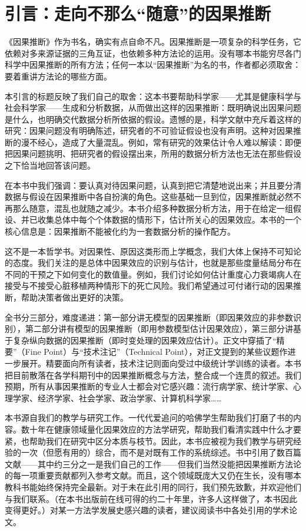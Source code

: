 \chapter*{引言：走向不那么“随意”的因果推断}
\thispagestyle{plain}

《因果推断》作为书名，确实有点自命不凡。因果推断是一项复杂的科学任务，它依赖对多来源证据的三角互证，也依赖多种方法论的运用。没有哪本书能穷尽各门科学中因果推断的所有方法；任何一本以“因果推断”为名的书，作者都必须取舍：要着重讲方法论的哪些方面。

本引言的标题反映了我们自己的取舍：这本书要帮助科学家——尤其是健康科学与社会科学家——生成和分析数据，从而做出这样的因果推断：既明确说出因果问题是什么，也明确交代数据分析所依据的假设。遗憾的是，科学文献中充斥着这样的研究：因果问题没有明确陈述，研究者的不可验证假设也没有声明。这种对因果推断的漫不经心，造成了大量混乱。例如，常有研究的效果估计令人难以解读：即便把因果问题挑明、把研究者的假设摆出来，所用的数据分析方法也无法在那些假设之下恰当地回答该问题。

在本书中我们强调：要认真对待因果问题，认真到把它清楚地说出来；并且要分清数据与假设在因果推断中各自扮演的角色。这些基础一旦到位，因果推断就必然不再那么随意，混乱也就随之减少。本书介绍多种数据分析方法，用于在给定一组假设、并已收集总体中每个个体数据的情形下，估计所关心的因果效应。本书的一个核心信息是：因果推断不能被化约为一套数据分析的操作配方。

这不是一本哲学书。对因果性、原因这类形而上学概念，我们大体上保持不可知论的态度。我们关注的是总体中因果效应的识别与估计，也就是那些度量结局分布在不同的干预之下如何变化的数值量。例如，我们讨论如何估计重度心力衰竭病人在接受与不接受心脏移植两种情形下的死亡风险。我们希望通过可付诸行动的因果推断，帮助决策者做出更好的决策。

全书分三部分，难度递进：第一部分讲无模型的因果推断（即因果效应的非参数识别），第二部分讲有模型的因果推断（即用参数模型估计因果效应），第三部分讲基于复杂纵向数据的因果推断（即时变处理的因果效应估计）。正文中穿插了“精要”（Fine Point）与“技术注记”（Technical Point），对正文提到的某些议题作进一步展开。精要面向所有读者，技术注记则面向受过中级统计学训练的读者。本书把目前散落在各学科期刊中的因果推断概念与方法，整合成一个连贯的叙述。我们预期，所有从事因果推断的专业人士都会对它感兴趣：流行病学家、统计学家、心理学家、经济学家、社会学家、政治学家、计算机科学家……

本书源自我们的教学与研究工作。一代代爱追问的哈佛学生帮助我们打磨了书的内容。数十年在健康领域量化因果效应的方法学研究，帮助我们看清实践中什么才要紧，也帮助我们在研究中区分本质与枝节。因此，本书应被视为我们教学与研究经验的一次（但愿有用的）综合，而不是对既有工作的系统综述。书中引用了数百篇文献——其中约三分之一是我们自己的工作——但我们当然没能把因果推断方法论的每一项重要贡献都列入参考文献。而且，这个领域既庞大又仍在生长，没有哪本教科书能始终保持完全最新。对于未在此引用的同行，我们预先致歉，并欢迎他们与我们联系。（在本书出版前在线可得的约二十年里，许多人这样做了，本书因此变得更好。）对某一方法学发展史感兴趣的读者，建议阅读书中各处引用的学术论文。

